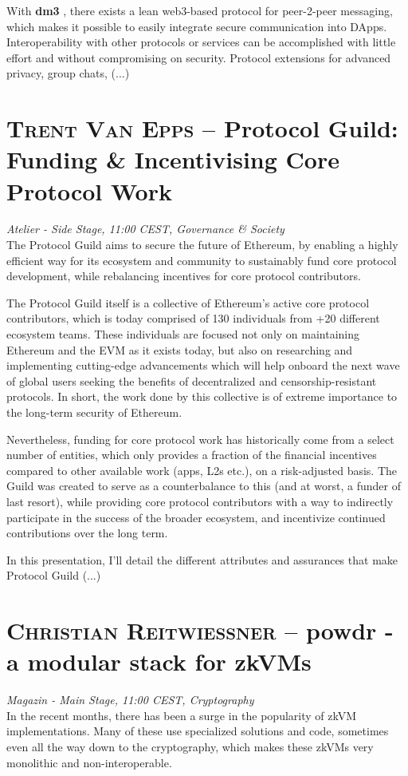 With \textbf{dm3}
, there exists a lean web3-based protocol for peer-2-peer messaging, which makes it possible to easily integrate secure communication into DApps. Interoperability with other protocols or services can be accomplished with little effort and without compromising on security. Protocol extensions for advanced privacy, group chats,
(...)\clearpage
\section {\textsc{Trent Van Epps} -- Protocol Guild: Funding \&
 Incentivising Core Protocol Work
} \noindent \textit {Atelier - Side Stage, 11:00 CEST, Governance \&
 Society
}\\[1em] The Protocol Guild aims to secure the future of Ethereum, by enabling a highly efficient way for its ecosystem and community to sustainably fund core protocol development, while rebalancing incentives for core protocol contributors.
\par The Protocol Guild itself is a collective of Ethereum's active core protocol contributors, which is today comprised of 130 individuals from +20 different ecosystem teams. These individuals are focused not only on maintaining Ethereum and the EVM as it exists today, but also on researching and implementing cutting-edge advancements which will help onboard the next wave of global users seeking the benefits of decentralized and censorship-resistant protocols. In short, the work done by this collective is of extreme importance to the long-term security of Ethereum.

Nevertheless, funding for core protocol work has historically come from a select number of entities, which only provides a fraction of the financial incentives compared to other available work (apps, L2s etc.), on a risk-adjusted basis. The Guild was created to serve as a counterbalance to this (and at worst, a funder of last resort), while providing core protocol contributors with a way to indirectly participate in the success of the broader ecosystem, and incentivize continued contributions over the long term.

In this presentation, I'll detail the different attributes and assurances that make Protocol Guild
(...)\clearpage
\section {\textsc{Christian Reitwiessner} -- powdr - a modular stack for zkVMs
} \noindent \textit {Magazin - Main Stage, 11:00 CEST, Cryptography
}\\[1em] In the recent months, there has been a surge in the popularity of zkVM implementations. Many of these use specialized solutions and code, sometimes even all the way down to the cryptography, which makes these zkVMs very monolithic and non-interoperable.

